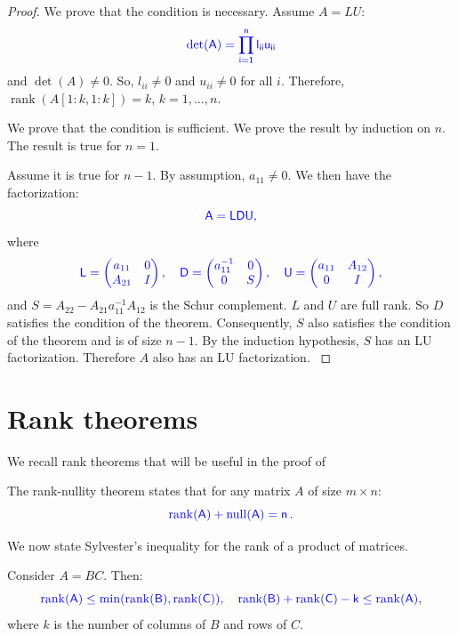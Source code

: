 \documentclass[10pt,twoside]{siamart1116}
\DeclareMathOperator{\rk}{rank}
\DeclareMathOperator{\nl}{null}
\numberwithin{theorem}{section}
\providecommand{\DIFadd}[1]{{\protect\color{blue} \sf #1}} %
\providecommand{\DIFaddbegin}{} %
\providecommand{\DIFaddend}{} %
\begin{document}
\begin{proof}
  \DIFadd{We prove that the condition is necessary. Assume $A = LU$:
  }\[ \DIFadd{\det(A) = \prod_{i=1}^n l_{ii} u_{ii} }\]
  \DIFadd{and $\det(A) \neq 0$. So, $l_{ii} \neq 0$ and $u_{ii} \neq 0$ for all $i$. Therefore, $\rk(A[1:k,1:k]) = k$, $k = 1, \ldots, n$.
}

  \DIFadd{We prove that the condition is sufficient. We prove the result by induction on $n$. The result is true for $n=1$.
}

  \DIFadd{Assume it is true for $n-1$. By assumption, $a_{11} \neq 0$. We then have the factorization:
  }\[
    \DIFadd{A = LDU,
  }\]
  \DIFadd{where
  }\[
    \DIFadd{L =
    \begin{pmatrix}
      a_{11} & 0 \\
      A_{21} & I
    \end{pmatrix}, \quad
    D =
    \begin{pmatrix}
      a_{11}^{-1} & 0 \\
      0           & S
    \end{pmatrix}, \quad
    U =
    \begin{pmatrix}
      a_{11} & A_{12} \\
      0      & I
    \end{pmatrix},
  }\]
  \DIFadd{and $S = A_{22} - A_{21} a_{11}^{-1} A_{12}$ is the Schur complement. $L$ and $U$ are full rank. So $D$ satisfies the condition of the theorem. Consequently, $S$ also satisfies the condition of the theorem and is of size $n-1$. By the induction hypothesis, $S$ has an LU factorization. Therefore $A$ also has an LU factorization.
}\end{proof}

\section{\DIFadd{Rank theorems}} \label{sec:rank}

\DIFadd{We recall rank theorems that will be useful in the proof of }\Cref{thm:main}\DIFadd{.
}

\begin{theorem}\label{thm:rank-nullity}
  \DIFadd{The rank-nullity theorem states that for any matrix $A$ of size $m \times n$:
  }\[
    \DIFadd{\rk(A) + \nl(A) = n \,.
  }\]
\end{theorem}

\DIFadd{We now state Sylvester's inequality for the rank of a product of matrices.
}

\DIFaddend \begin{lemma}\DIFaddbegin \label{lem:rank}
  \DIFadd{Consider $A = BC$. Then:
  }\[
    \DIFadd{\rk(A) \le \min(\rk(B), \rk(C)), \quad
    \rk(B) + \rk(C) - k \le \rk(A),
  }\]
  \DIFadd{where $k$ is the number of columns of $B$ and rows of $C$.
}\end{lemma}
\end{document}
